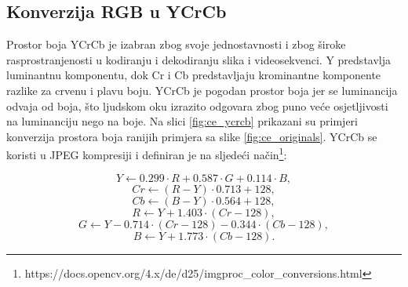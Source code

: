 \documentclass[times, utf8, diplomski]{fer}
\begin{document}
\subsection{Konverzija RGB u YCrCb}
Prostor boja YCrCb je izabran zbog svoje jednostavnosti i zbog široke rasprostranjenosti u kodiranju i dekodiranju slika i videosekvenci. Y predstavlja luminantnu  komponentu, dok Cr i Cb predstavljaju krominantne  komponente razlike za crvenu i plavu boju. YCrCb je pogodan prostor boja jer se luminancija odvaja od boja, što ljudskom oku izrazito odgovara zbog puno veće osjetljivosti na luminanciju nego na boje. Na slici \ref{fig:ce_ycrcb} prikazani su primjeri konverzija prostora boja ranijih primjera sa slike \ref{fig:ce_originals}. YCrCb se koristi u JPEG kompresiji i definiran je na sljedeći način\footnote{https://docs.opencv.org/4.x/de/d25/imgproc\_color\_conversions.html}:

\begin{equation}
    Y \leftarrow 0.299 \cdot R + 0.587 \cdot G + 0.114 \cdot B,
\end{equation}
\begin{equation}
    Cr \leftarrow (R - Y) \cdot 0.713 + 128,
\end{equation}
\begin{equation}
    Cb \leftarrow (B - Y) \cdot 0.564 + 128,
\end{equation}
\begin{equation}
    R \leftarrow Y + 1.403 \cdot (Cr - 128),
\end{equation}
\begin{equation}
    G \leftarrow Y - 0.714 \cdot (Cr - 128) - 0.344 \cdot (Cb - 128),
\end{equation}
\begin{equation}
    B \leftarrow Y + 1.773 \cdot (Cb - 128).
\end{equation}

\bigskip
\end{document}
